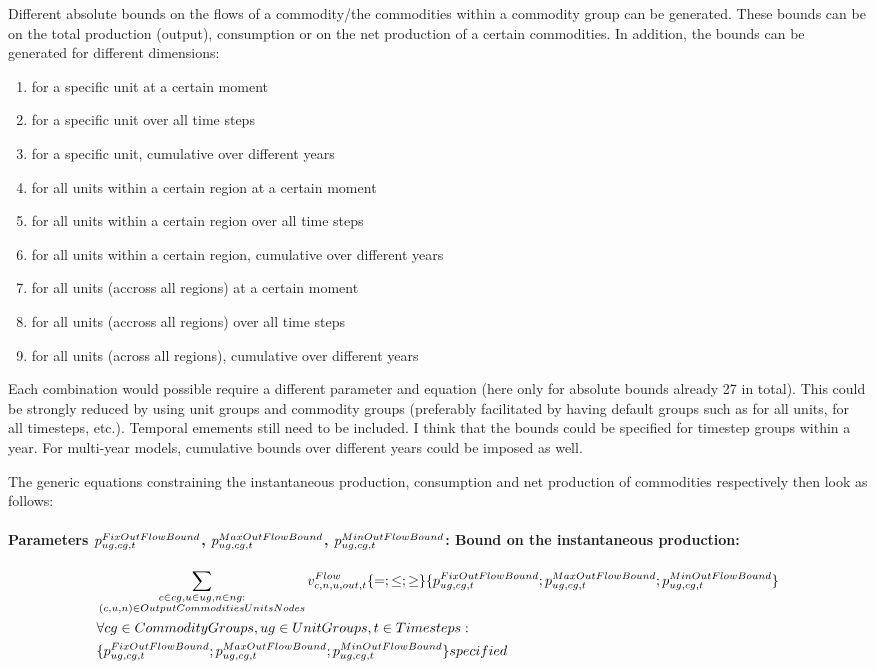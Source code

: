Different absolute bounds on the flows of a commodity/the commodities within a commodity group can be generated. These bounds can be on the total production (output), consumption or on the net production of a certain commodities. In addition, the bounds can be generated for different dimensions:
\begin{enumerate}
	\item for a specific unit at a certain moment
	\item for a specific unit over all time steps
	\item for a specific unit, cumulative over different years
	\item for all units within a certain region at a certain moment
	\item for all units within a certain region over all time steps
	\item for all units within a certain region, cumulative over different years
	\item for all units (accross all regions) at a certain moment
	\item for all units (accross all regions) over all time steps
	\item for all units (across all regions), cumulative over different years
\end{enumerate}
Each combination would possible require a different parameter and equation (here only for absolute bounds already 27 in total). This could be strongly reduced by using unit groups and commodity groups (preferably facilitated by having default groups such as for all units, for all timesteps, etc.). {\color{red} Temporal emements still need to be included. I think that the bounds could be specified for timestep groups within a year. For multi-year models, cumulative bounds over different years could be imposed as well.}


 The generic equations constraining the instantaneous production, consumption and net production of commodities respectively then look as follows: 

\paragraph{Parameters $\pFixOutFlowBound$, $\pMaxOutFlowBound$, $\pMinOutFlowBound$: Bound on the instantaneous production:}
\begin{align} \label{eq:outflowbound}
&\sum_{\substack{\commodity \in \commoditygroup, \unit \in \unitgroup, \node \in \nodegroup: \\ \OutputCommoditiesUnitsNodes}} \vFlow[\commodity,\node,\unit,out,\timestep]  \{=;\le;\ge\} \{\pFixOutFlowBound;\pMaxOutFlowBound;\pMinOutFlowBound\} \nonumber \\
&\forall \commoditygroups, \unitgroups, \timesteps : \nonumber \\
&\{\pFixOutFlowBound;\pMaxOutFlowBound;\pMinOutFlowBound\} specified
\end{align}

